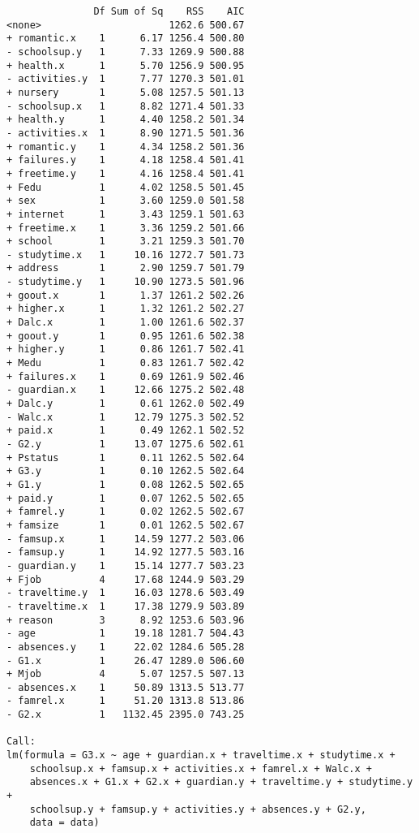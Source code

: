 \documentclass[11pt]{article}
\begin{document}
\begin{enumerate}
\begin{verbatim}
               Df Sum of Sq    RSS    AIC
<none>                      1262.6 500.67
+ romantic.x    1      6.17 1256.4 500.80
- schoolsup.y   1      7.33 1269.9 500.88
+ health.x      1      5.70 1256.9 500.95
- activities.y  1      7.77 1270.3 501.01
+ nursery       1      5.08 1257.5 501.13
- schoolsup.x   1      8.82 1271.4 501.33
+ health.y      1      4.40 1258.2 501.34
- activities.x  1      8.90 1271.5 501.36
+ romantic.y    1      4.34 1258.2 501.36
+ failures.y    1      4.18 1258.4 501.41
+ freetime.y    1      4.16 1258.4 501.41
+ Fedu          1      4.02 1258.5 501.45
+ sex           1      3.60 1259.0 501.58
+ internet      1      3.43 1259.1 501.63
+ freetime.x    1      3.36 1259.2 501.66
+ school        1      3.21 1259.3 501.70
- studytime.x   1     10.16 1272.7 501.73
+ address       1      2.90 1259.7 501.79
- studytime.y   1     10.90 1273.5 501.96
+ goout.x       1      1.37 1261.2 502.26
+ higher.x      1      1.32 1261.2 502.27
+ Dalc.x        1      1.00 1261.6 502.37
+ goout.y       1      0.95 1261.6 502.38
+ higher.y      1      0.86 1261.7 502.41
+ Medu          1      0.83 1261.7 502.42
+ failures.x    1      0.69 1261.9 502.46
- guardian.x    1     12.66 1275.2 502.48
+ Dalc.y        1      0.61 1262.0 502.49
- Walc.x        1     12.79 1275.3 502.52
+ paid.x        1      0.49 1262.1 502.52
- G2.y          1     13.07 1275.6 502.61
+ Pstatus       1      0.11 1262.5 502.64
+ G3.y          1      0.10 1262.5 502.64
+ G1.y          1      0.08 1262.5 502.65
+ paid.y        1      0.07 1262.5 502.65
+ famrel.y      1      0.02 1262.5 502.67
+ famsize       1      0.01 1262.5 502.67
- famsup.x      1     14.59 1277.2 503.06
- famsup.y      1     14.92 1277.5 503.16
- guardian.y    1     15.14 1277.7 503.23
+ Fjob          4     17.68 1244.9 503.29
- traveltime.y  1     16.03 1278.6 503.49
- traveltime.x  1     17.38 1279.9 503.89
+ reason        3      8.92 1253.6 503.96
- age           1     19.18 1281.7 504.43
- absences.y    1     22.02 1284.6 505.28
- G1.x          1     26.47 1289.0 506.60
+ Mjob          4      5.07 1257.5 507.13
- absences.x    1     50.89 1313.5 513.77
- famrel.x      1     51.20 1313.8 513.86
- G2.x          1   1132.45 2395.0 743.25

Call:
lm(formula = G3.x ~ age + guardian.x + traveltime.x + studytime.x + 
    schoolsup.x + famsup.x + activities.x + famrel.x + Walc.x + 
    absences.x + G1.x + G2.x + guardian.y + traveltime.y + studytime.y + 
    schoolsup.y + famsup.y + activities.y + absences.y + G2.y, 
    data = data)


\end{verbatim}
\end{enumerate}
\end{document}
